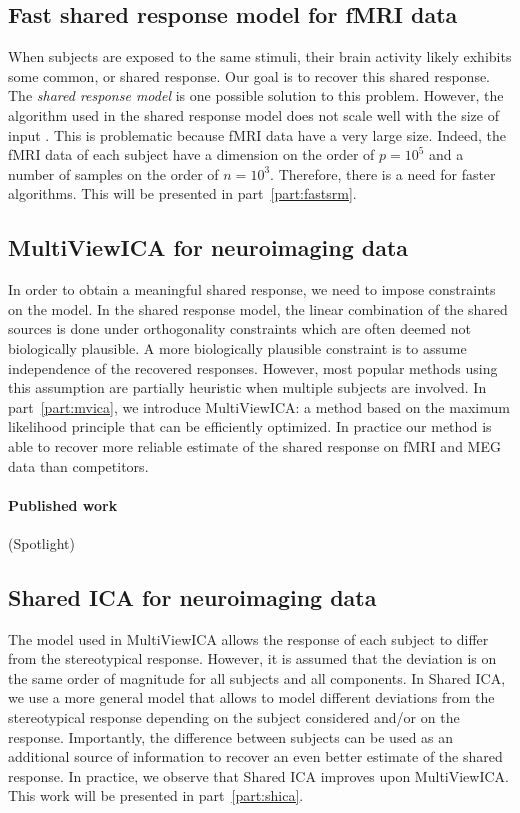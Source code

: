 \documentclass[ twoside,openright,titlepage,numbers=noenddot,%
                headinclude,footinclude,cleardoublepage=empty,abstract=on,
                BCOR=5mm,paper=a4,fontsize=11pt, 
                ]{scrreprt}
\begin{document}
\subsection{Fast shared response model for fMRI data}
When subjects are exposed to the same stimuli, their brain activity likely exhibits
some common, or shared response. Our goal is to recover this shared response. The \emph{shared
response model} is one possible solution to this problem.
However, the algorithm used in the shared response model does not scale well
with the size of input . This is problematic because fMRI data have a very large
size. Indeed, the fMRI data of each subject have a dimension on the order of
$p=10^5$ and a number of samples on the order of $n=10^3$. Therefore, there is a
need for faster algorithms. This will be presented in part~\ref{part:fastsrm}.

\subsection{MultiViewICA for neuroimaging data}
In order to obtain a meaningful shared response, we need to impose constraints on
the model. In the shared response model, the linear combination of the shared
sources is done under orthogonality constraints which are often deemed not
biologically plausible. A more biologically plausible constraint is
to assume independence of the recovered responses.
However, most popular methods using this assumption are partially heuristic when
multiple subjects are involved.
In part~\ref{part:mvica}, we introduce MultiViewICA: a method based on the
maximum likelihood principle that can be efficiently optimized.
In practice our method is able to recover more reliable estimate of
the shared response on fMRI and MEG data than competitors.

\paragraph{Published work} (Spotlight)

\subsection{Shared ICA for neuroimaging data}
The model used in MultiViewICA allows the response of each subject to differ
from the stereotypical response. However, it is assumed that the deviation is on
the same order of magnitude for all subjects and all components.
In Shared ICA, we use a more general model that allows to model different
deviations from the stereotypical response depending on the subject considered
and/or on the response. Importantly, the difference between subjects can be used
as an additional source of information to recover an even better estimate of the
shared response. In practice, we observe that Shared ICA improves upon
MultiViewICA. This work will be presented in part~\ref{part:shica}.
\end{document}
